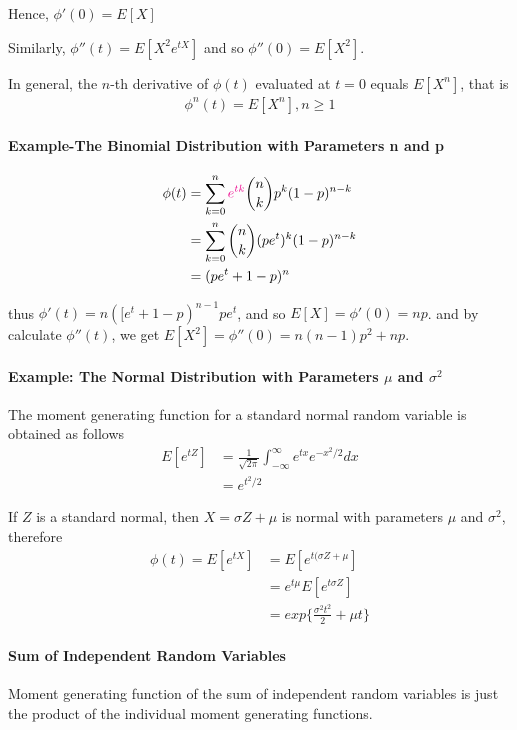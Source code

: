 \documentclass[10 pt,final]{article}
\newcommand{\impo}[1]{{\color{magenta} #1}}
\begin{document}
Hence, $\phi'(0) = E[X]$

Similarly, $\phi''(t) = E[X^2 e^{tX}]$ and so $\phi''(0) = E[X^2]$.

In general, the $n$-th derivative of $\phi(t)$ evaluated at $t=0$ equals $E[X^n]$, that is
\begin{align*}
\phi^n(t) = E[X^n], n \geq 1
\end{align*}

\paragraph{Example-The Binomial Distribution with Parameters n and p} 
\begin{align*}
\phi(t) & = \sum^n_{k=0} \impo{e^{tk}} \binom{n}{k} p^k (1-p)^{n-k} \\
& = \sum^n_{k=0} \binom{n}{k} (pe^t)^k(1-p)^{n-k} \\
& =(pe^t+1-p)^n
\end{align*}

thus $\phi'(t) = n([e^t+1-p)^{n-1} pe^t$, and so $E[X] = \phi'(0) = np$.
and by calculate $\phi''(t)$, we get $E[X^2] = \phi''(0) = n(n-1)p^2 + np$. 


\paragraph{Example: The Normal Distribution with Parameters $\mu$ and $\sigma^2$} The moment generating function for a standard normal random variable is obtained as follows
\begin{align*}
E[e^{tZ}] & = \frac{1}{\sqrt{2 \pi}} \int_{-\infty}^\infty e^{tx} e^{-x^2/2} dx \\
& = e^{t^2/2}
\end{align*}

If $Z$ is a standard normal, then $X = \sigma Z + \mu$ is normal with parameters $\mu$ and $\sigma^2$, therefore
\begin{align*}
\phi(t) = E[e^{tX}] & = E[e^{t(\sigma Z + \mu}] \\
& = e^{t\mu} E[e^{t \sigma Z}] \\
& = exp\{\frac{\sigma^2 t^2}{2} + \mu t\}
\end{align*}



\paragraph{Sum of Independent Random Variables} Moment generating function of the \impo{sum of independent random variables} is just the \impo{product} of the individual moment generating functions. 
\end{document}
